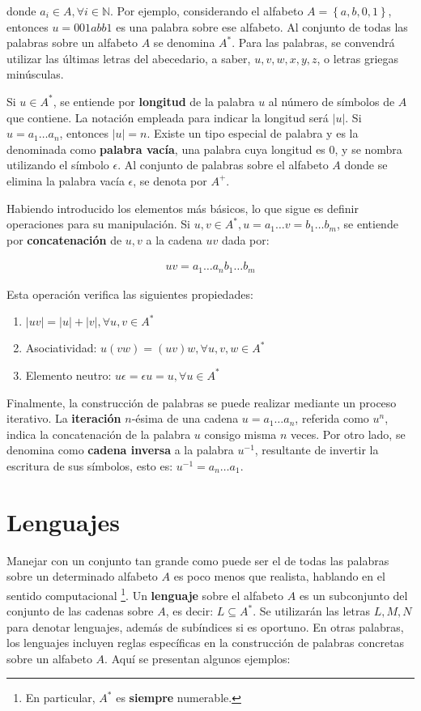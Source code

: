 donde $a_i \in A, \forall i \in \mathbb{N}$. Por ejemplo, considerando el alfabeto $A = \left\lbrace a,b,0,1 \right\rbrace$, entonces $u = 001abb1$ es una palabra sobre ese alfabeto. Al conjunto de todas las palabras sobre un alfabeto $A$ se denomina $A^*$. Para las palabras, se convendrá utilizar las últimas letras del abecedario, a saber, $u,v,w,x,y,z$, o letras griegas minúsculas.

Si $u \in A^*$, se entiende por \textbf{longitud} de la palabra $u$ al número de símbolos de $A$ que contiene. La notación empleada para indicar la longitud será $|u|$. Si $u = a_1\ldots a_n$, entonces $|u| = n$. Existe un tipo especial de palabra y es la denominada como \textbf{palabra vacía}, una palabra cuya longitud es 0, y se nombra utilizando el símbolo $\epsilon$. Al conjunto de palabras sobre el alfabeto $A$ donde se elimina la palabra vacía $\epsilon$, se denota por $A^+$.

Habiendo introducido los elementos más básicos, lo que sigue es definir operaciones para su manipulación. Si $u,v \in A^*, u=a_1 \ldots v=b_1\ldots b_m$, se entiende por \textbf{concatenación} de $u,v$ a la cadena $uv$ dada por:

\begin{align*}
    uv = a_1 \ldots a_n b_1 \ldots b_m
\end{align*}

\noindent
Esta operación verifica las siguientes propiedades:
\begin{enumerate}
    \item $|uv| = |u| + |v|, \forall u,v \in A^*$
    \item  Asociatividad: $u(vw) = (uv)w, \forall u,v,w \in A^*$
    \item Elemento neutro: $u\epsilon = \epsilon u = u, \forall u \in A^*$
\end{enumerate}

Finalmente, la construcción de palabras se puede realizar mediante un proceso iterativo. La \textbf{iteración} $n$-ésima de una cadena $u = a_1 \ldots a_n$, referida como $u^n$, indica la concatenación de la palabra $u$ consigo misma $n$ veces. Por otro lado, se denomina como \textbf{cadena inversa} a la palabra $u^{-1}$, resultante de invertir la escritura de sus símbolos, esto es: $u^{-1} = a_n \ldots a_1$.

\section{Lenguajes}\label{section:languages}
Manejar con un conjunto tan grande como puede ser el de todas las palabras sobre un determinado alfabeto $A$ es poco menos que realista, hablando en el sentido computacional \footnote{En particular, $A^*$ es \textbf{siempre} numerable.}. Un \textbf{lenguaje} sobre el alfabeto $A$ es un subconjunto del conjunto de las cadenas sobre $A$, es decir: $L \subseteq A^*$. Se utilizarán las letras $L,M,N$ para denotar lenguajes, además de subíndices si es oportuno. En otras palabras, los lenguajes incluyen reglas específicas en la construcción de palabras concretas sobre un alfabeto $A$. Aquí se presentan algunos ejemplos:

